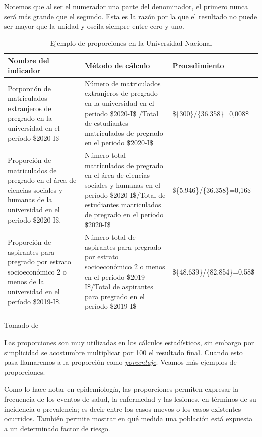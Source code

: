 \documentclass[
]{book}
\begin{document}
Notemos que al ser el numerador una parte del denominador, el primero
nunca será más grande que el segundo. Esta es la razón por la que el resultado no puede ser mayor que la unidad y oscila siempre entre cero y uno.

\begin{table}

\caption{\label{tab:unnamed-chunk-3}Ejemplo de proporciones en la Universidad Nacional}
\centering
\begin{tabular}[t]{l|l|l}
\hline
Nombre del indicador & Método de cálculo & Procedimiento\\
\hline
Porporción de matriculados extranjeros de pregrado en la universidad en el período \$2020-I\$ & Número de  matriculados extranjeros de pregrado en la universidad en el periodo \$2020-I\$ /Total de estudiantes matriculados de pregrado en el periodo \$2020-I\$ & \$\{300\}/\{36.358\}=0,008\$\\
\hline
Proporción de matriculados de pregrado en el área de ciencias sociales y humanas de la universidad en el periodo \$2020-I\$. & Número total matriculados de pregrado en el área de ciencias sociales y humanas en el período \$2020-I\$/Total de estudiantes matriculados de pregrado en el período \$2020-I\$ & \$\{5.946\}/\{36.358\}=0,16\$\\
\hline
Proporción de aspirantes para pregrado por estrato socioeconómico 2 o menos de la universidad en el período \$2019-I\$. & Número total de aspirantes para pregrado por estrato socioeconómico 2 o menos en el período \$2019-I\$/Total de aspirantes para pregrado en el período \$2019-I\$ & \$\{48.639\}/\{82.854\}=0,58\$\\
\hline
\end{tabular}
\end{table}

Tomado de \citep{BibEntry244021Mar}

Las proporciones son muy utilizadas en los cálculos estadísticos, sin embargo por simplicidad se acostumbre multiplicar por 100 el resultado final. Cuando esto pasa llamaremos a la proporción como \protect\hyperlink{porcentaje}{\emph{porcentaje}}. Veamos más ejemplos de proporciones.

Como lo hace notar \citet{franco2016estadistica} en epidemiología, las proporciones permiten expresar la frecuencia de los eventos de salud, la enfermedad y las lesiones, en términos de su incidencia o prevalencia; es decir entre los casos nuevos o los casos existentes ocurridos. También permite mostrar en qué medida una población está expuesta a un
determinado factor de riesgo.
\end{document}
